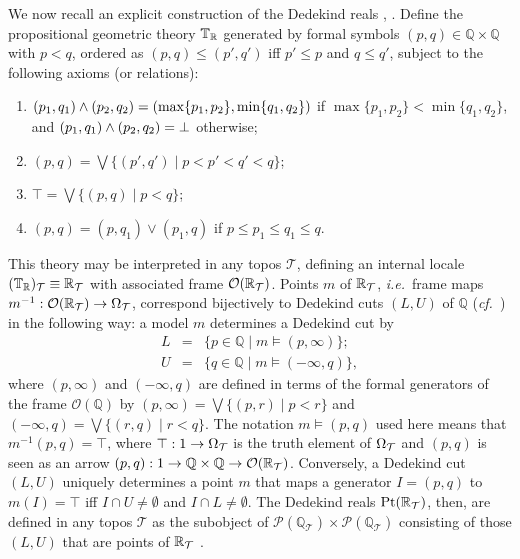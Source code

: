 \documentclass[11pt]{article}
\newcommand{\Q}{\mathbb{Q}}
\newcommand{\raw}{\rightarrow} \newcommand{\rat}{\mapsto}
\newcommand{\x}{\times} \newcommand{\hb}{\hbar}
\newcommand{\inv}{^{-1}}
\newcommand{\CO}{{\mathcal O}} \newcommand{\CP}{{\mathcal P}}
\newcommand{\CT}{{\mathcal T}} \newcommand{\CV}{{\mathcal V}}
\newcommand{\T}{{\mathbb T}} \newcommand{\Z}{{\mathbb Z}}
\newcommand{\ie}{\textit{i.e.}}
\begin{document}
We now  recall an explicit construction of the Dedekind reals
\cite{fourmangrayson}, \cite[D4.7.4 \&\ D4.7.5]{johnstone02b}.
Define the propositional geometric theory $\T_{\R}$
 generated by formal symbols $(p,q)\in\Q\x\Q$ 
 with $p<q$, ordered as $(p,q)\leqslant (p',q')$ iff $p'\leqslant p$ and $q\leqslant q'$,
  subject to the following axioms (or relations):
 \begin{enumerate}
\item $(p_1,q_1)\wedge (p_2,q_2)=(\max\{p_1,p_2\},\min\{q_1,q_2\})$ if
$\max\{p_1,p_2\}<\min\{q_1,q_2\}$, and $(p_1,q_1)\wedge (p_2,q_2)=\bot$ otherwise;
\item $(p,q)=\bigvee \{(p',q')\mid p<p'<q'<q\}$;
\item $\top=\bigvee \{(p,q)\mid p<q\}$;
\item $(p,q)=(p,q_1)\vee (p_1,q)$ if $p\leqslant p_1\leqslant q_1\leqslant q$.
\end{enumerate}

This theory may be interpreted in any topos $\CT$, defining an internal locale
$(\T_{\R})_{\CT}\equiv \R_{\CT}$ with associated frame $\CO(\R_{\CT})$.
Points $m$ of  $\R_{\CT}$, \ie\  frame maps
$m\inv:\CO(\R_{\CT})\raw\Om_{\CT}$,  correspond bijectively to Dedekind cuts $(L,U)$ of
$\Q$ ({\it cf.}\ \cite[p.\ 321]{maclanemoerdijk92}) in the following way: a
model $m$ determines a Dedekind cut by
\begin{eqnarray}
L&=& \{p\in\Q\mid m\models (p,\infty) \};\label{eq21}\\
U&=& \{q\in\Q\mid m\models  (-\infty,q)\},\label{eq22}
\end{eqnarray}
where $(p,\infty)$ and $(-\infty,q)$ are defined in terms of the formal generators of the frame
$\mathcal{O}(\Q)$ by $(p,\infty)=\bigvee \{(p,r)\mid p<r\}$ and $(-\infty,q)=\bigvee \{(r,q)\mid r<q\}$. 
The notation $m\models (p,q)$ used here means that $m\inv (p,q)=\top$, where
$\top:1\raw\Om_{\CT}$ is the truth element of $\Om_{\CT}$ and $(p,q)$ is seen as an arrow
$(p,q):1\raw \Q\x\Q\raw \CO(\R_{\CT})$.
Conversely, a Dedekind cut $(L,U)$ uniquely determines a point $m$
that maps a  generator $I=(p,q)$ to
$m(I)=\top$ iff $I\cap U\neq \emptyset$ and $I\cap L\neq \emptyset$.
The Dedekind reals  $\mathrm{Pt}(\R_{\CT})$, then,
 are defined in any topos $\CT$
 as the subobject of \hbox{$\CP(\Q_{\CT})\x\CP(\Q_{\CT})$} consisting of those
$(L,U)$ that are points of $\R_{\CT}$  \cite{maclanemoerdijk92}.
\end{document}
